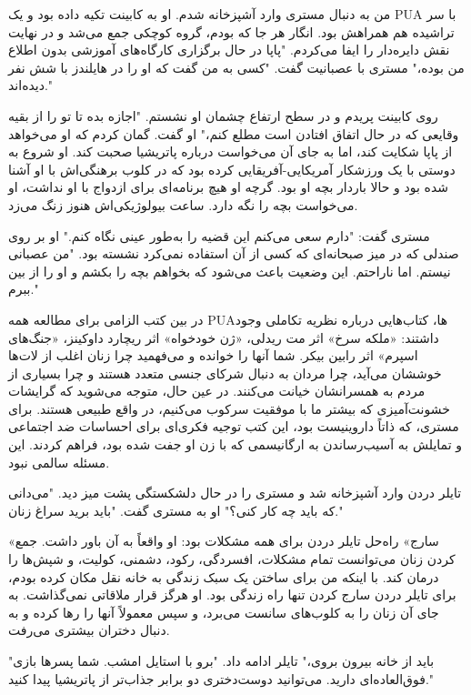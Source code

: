 من به دنبال مستری وارد آشپزخانه شدم. او به کابینت تکیه داده بود و یک PUA با سر تراشیده هم همراهش بود. انگار هر جا که بودم، گروه کوچکی جمع می‌شد و در نهایت نقش دایره‌دار را ایفا می‌کردم. "پاپا در حال برگزاری کارگاه‌های آموزشی بدون اطلاع من بوده،" مستری با عصبانیت گفت. "کسی به من گفت که او را در هایلندز با شش نفر دیده‌اند."

روی کابینت پریدم و در سطح ارتفاع چشمان او نشستم. "اجازه بده تا تو را از بقیه وقایعی که در حال اتفاق افتادن است مطلع کنم،" او گفت. گمان کردم که او می‌خواهد از پاپا شکایت کند، اما به جای آن می‌خواست درباره پاتریشیا صحبت کند. او شروع به دوستی با یک ورزشکار آمریکایی-آفریقایی کرده بود که در کلوب برهنگی‌اش با او آشنا شده بود و حالا باردار بچه او بود. گرچه او هیچ برنامه‌ای برای ازدواج با او نداشت، او می‌خواست بچه را نگه دارد. ساعت بیولوژیکی‌اش هنوز زنگ می‌زد.

مستری گفت: "دارم سعی می‌کنم این قضیه را به‌طور عینی نگاه کنم." او بر روی صندلی که در میز صبحانه‌ای که کسی از آن استفاده نمی‌کرد نشسته بود. "من عصبانی نیستم. اما ناراحتم. این وضعیت باعث می‌شود که بخواهم بچه را بکشم و او را از بین ببرم."

در بین کتب الزامی برای مطالعه همه PUAها، کتاب‌هایی درباره نظریه تکاملی وجود داشتند: «ملکه سرخ» اثر مت ریدلی، «ژن خودخواه» اثر ریچارد داوکینز، «جنگ‌های اسپرم» اثر رابین بیکر. شما آنها را خوانده و می‌فهمید چرا زنان اغلب از لات‌ها خوششان می‌آید، چرا مردان به دنبال شرکای جنسی متعدد هستند و چرا بسیاری از مردم به همسرانشان خیانت می‌کنند. در عین حال، متوجه می‌شوید که گرایشات خشونت‌آمیزی که بیشتر ما با موفقیت سرکوب می‌کنیم، در واقع طبیعی هستند. برای مستری، که ذاتاً داروینیست بود، این کتب توجیه فکری‌ای برای احساسات ضد اجتماعی و تمایلش به آسیب‌رساندن به ارگانیسمی که با زن او جفت شده بود، فراهم کردند. این مسئله سالمی نبود.

تایلر دردن وارد آشپزخانه شد و مستری را در حال دلشکستگی پشت میز دید. "می‌دانی که باید چه کار کنی؟" او به مستری گفت. "باید برید سراغ زنان."

«سارج» راه‌حل تایلر دردن برای همه مشکلات بود: او واقعاً به آن باور داشت. جمع کردن زنان می‌توانست تمام مشکلات، افسردگی، رکود، دشمنی، کولیت، و شپش‌ها را درمان کند. با اینکه من برای ساختن یک سبک زندگی به خانه نقل مکان کرده بودم، برای تایلر دردن سارج کردن تنها راه زندگی بود. او هرگز قرار ملاقاتی نمی‌گذاشت. به جای آن زنان را به کلوب‌های سانست می‌برد، و سپس معمولاً آنها را رها کرده و به دنبال دختران بیشتری می‌رفت.

"باید از خانه بیرون بروی،" تایلر ادامه داد. "برو با استایل امشب. شما پسرها بازی فوق‌العاده‌ای دارید. می‌توانید دوست‌دختری دو برابر جذاب‌تر از پاتریشیا پیدا کنید."

